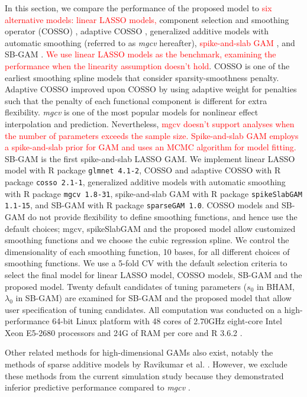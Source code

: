 \documentclass[AMA,STIX1COL,]{WileyNJD-v2}
\begin{document}
In this section, we compare the performance of the proposed model to
\textcolor{red}{six alternative models: linear LASSO models,} component
selection and smoothing operator (COSSO) \citep{Zhang2006GAM}, adaptive
COSSO \citep{Storlie2011}, generalized additive models with automatic
smoothing (referred to as \textit{mgcv} hereafter)\citep{Wood2011},
\textcolor{red}{spike-and-slab GAM \cite{Scheipl2012}}, and SB-GAM
\citep{Bai2021}.
\textcolor{red}{We use linear LASSO models as the benchmark, examining the performance when the linearity assumption doesn't hold}.
COSSO is one of the earliest smoothing spline models that consider
sparsity-smoothness penalty. Adaptive COSSO improved upon COSSO by using
adaptive weight for penalties such that the penalty of each functional
component is different for extra flexibility. \textit{mgcv} is one of
the most popular models for nonlinear effect interpolation and
prediction. Nevertheless,
\textcolor{red}{mgcv doesn't support analyses when the number of parameters exceeds the sample size.}
\textcolor{red}{Spike-and-slab GAM employs a spike-and-slab prior for GAM and uses an MCMC algorithm for model fitting.}
SB-GAM is the first spike-and-slab LASSO GAM. We implement linear LASSO
model with R package \texttt{glmnet 4.1-2}, COSSO and adaptive COSSO
with R package \texttt{cosso 2.1-1}, generalized additive models with
automatic smoothing with R package \texttt{mgcv 1.8-31}, spike-and-slab
GAM with R package \texttt{spikeSlabGAM 1.1-15}, and SB-GAM with R
package \texttt{sparseGAM 1.0}. COSSO models and SB-GAM do not provide
flexibility to define smoothing functions, and hence use the default
choices; mgcv, spikeSlabGAM and the proposed model allow customized
smoothing functions and we choose the cubic regression spline. We
control the dimensionality of each smoothing function, 10 bases, for all
different choices of smoothing functions. We use a 5-fold CV with the
default selection criteria to select the final model for linear LASSO
model, COSSO models, SB-GAM and the proposed model. Twenty default
candidates of tuning parameters (\(s_0\) in BHAM, \(\lambda_0\) in
SB-GAM) are examined for SB-GAM and the proposed model that allow user
specification of tuning candidates. All computation was conducted on a
high-performance 64-bit Linux platform with 48 cores of 2.70GHz
eight-core Intel Xeon E5-2680 processors and 24G of RAM per core and R
3.6.2 \citep{R}.

Other related methods for high-dimensional GAMs also exist, notably the
methods of sparse additive models by Ravikumar et al.
\citep{Ravikumar2009}. However, we exclude these methods from the
current simulation study because they demonstrated inferior predictive
performance compared to \textit{mgcv} \citep{Scheipl2013}.
\end{document}
